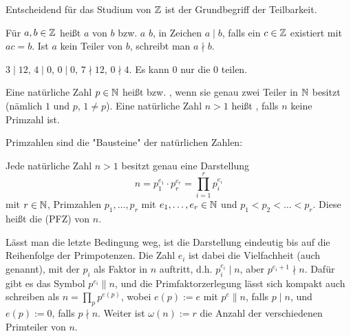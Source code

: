 Entscheidend für das Studium von $\mathbb{Z}$ ist der Grundbegriff der Teilbarkeit.
\begin{defn}[Teilbarkeit]
	Für $a,b \in \mathbb{Z}$ heißt $a$  von $b$ bzw. $a$  $b$, in Zeichen $a \mid b$, falls ein $c \in \mathbb{Z}$ existiert mit $ac = b$. Ist $a$ kein Teiler von $b$, schreibt man $a \nmid b$.
\end{defn}

\begin{bsp}
	$3 \mid 12$, $4 \mid 0$, $0 \mid 0$, $7 \nmid 12$, $0 \nmid 4$. Es kann $0$ nur die $0$ teilen.
\end{bsp}

\begin{defn}[Primzahl]
	Eine natürliche Zahl $p \in \mathbb{N}$ heißt  bzw. , wenn sie genau zwei Teiler in $\mathbb{N}$ besitzt (nämlich $1$ und $p$, $1 \neq p$). Eine natürliche Zahl $n > 1$ heißt , falls $n$ keine Primzahl ist. 
\end{defn}

Primzahlen sind die "Bausteine" der natürlichen Zahlen:
\begin{satz}
	Jede natürliche Zahl $n > 1$ besitzt genau eine Darstellung
	\[ n = p_1^{e_1} \cdot p_r^{e_r} = \prod\limits_{i=1}^{r} p_i^{e_i} \]
	mit $r \in \mathbb{N}$, Primzahlen $p_1, \dots, p_r$ mit $e_1,\dots,e_r \in \mathbb{N}$ und $p_1 < p_2 < \dots < p_r$. Diese heißt die  (PFZ) von $n$.
\end{satz}

\begin{bem}
	Lässt man die letzte Bedingung weg, ist die Darstellung eindeutig bis auf die Reihenfolge der Primpotenzen. Die Zahl $e_i$ ist dabei die Vielfachheit (auch  genannt), mit der $p_i$ als Faktor in $n$ auftritt, d.h. $p_i^{e_i} \mid n$, aber $p^{e_i+1} \nmid n$. Dafür gibt es das Symbol $p^{e_i} \parallel n$, und die Primfaktorzerlegung lässt sich kompakt auch schreiben als $n = \prod\limits_{p} p^{e(p)}$, wobei $e(p) := e$ mit $p^e \parallel n$, falls $p \mid n$, und $e(p) := 0$, falls $p \nmid n$. Weiter ist $\omega(n) := r$ die Anzahl der verschiedenen Primteiler von $n$.
\end{bem}

